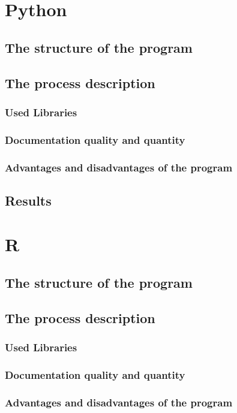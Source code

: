 \documentclass{article}
\begin{document}
\newpage
\section{Python}
\subsection{The structure of the program}
\subsection{The process description}
\subsubsection{Used Libraries}
\subsubsection{Documentation quality and quantity}
\subsubsection{Advantages and disadvantages of the program}
\subsection{Results}

\newpage
\section{R}
\subsection{The structure of the program}
\subsection{The process description}
\subsubsection{Used Libraries}
\subsubsection{Documentation quality and quantity}
\subsubsection{Advantages and disadvantages of the program}
\end{document}
